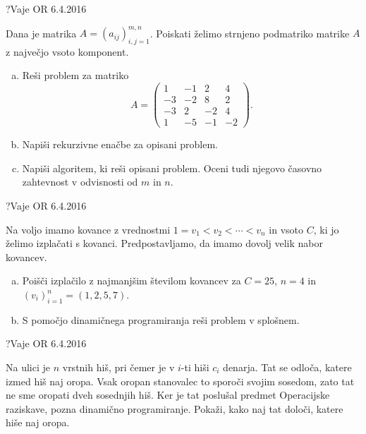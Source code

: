 \begin{naloga}{?}{Vaje OR 6.4.2016}
\begin{vprasanje}
Dana je matrika $A = (a_{ij})_{i,j=1}^{m,n}$.
Poiskati želimo strnjeno podmatriko matrike $A$
z največjo vsoto komponent.
\begin{enumerate}[(a)]
\item Reši problem za matriko
$$
A = \begin{pmatrix}
 1 & -1 &  2 &  4 \\
-3 & -2 &  8 &  2 \\
-3 &  2 & -2 &  4 \\
 1 & -5 & -1 & -2
\end{pmatrix} .
$$
\item Napiši rekurzivne enačbe za opisani problem.
\item Napiši algoritem, ki reši opisani problem.
Oceni tudi njegovo časovno zahtevnost v odvisnosti od $m$ in $n$.
\end{enumerate}

\end{vprasanje}
\begin{odgovor}
\end{odgovor}
\end{naloga}


\begin{naloga}{?}{Vaje OR 6.4.2016}
\begin{vprasanje}
Na voljo imamo kovance z vrednostmi $1 = v_1 < v_2 < \cdots < v_n$
in vsoto $C$, ki jo želimo izplačati s kovanci.
Predpostavljamo, da imamo dovolj velik nabor kovancev.
\begin{enumerate}[(a)]
\item Poišči izplačilo z najmanjšim številom kovancev
za $C = 25$, $n = 4$ in $(v_i)_{i=1}^n = (1, 2, 5, 7)$.
\item S pomočjo dinamičnega programiranja reši problem v splošnem.
\end{enumerate}

\end{vprasanje}
\begin{odgovor}
\end{odgovor}
\end{naloga}


\begin{naloga}{?}{Vaje OR 6.4.2016}
\begin{vprasanje}
Na ulici je $n$ vrstnih hiš,
pri čemer je v $i$-ti hiši $c_i$ denarja.
Tat se odloča, katere izmed hiš naj oropa.
Vsak oropan stanovalec to sporoči svojim sosedom,
zato tat ne sme oropati dveh sosednjih hiš.
Ker je tat poslušal predmet Operacijske raziskave,
pozna dinamično programiranje.
Pokaži, kako naj tat določi, katere hiše naj oropa.

\end{vprasanje}
\begin{odgovor}
\end{odgovor}
\end{naloga}


